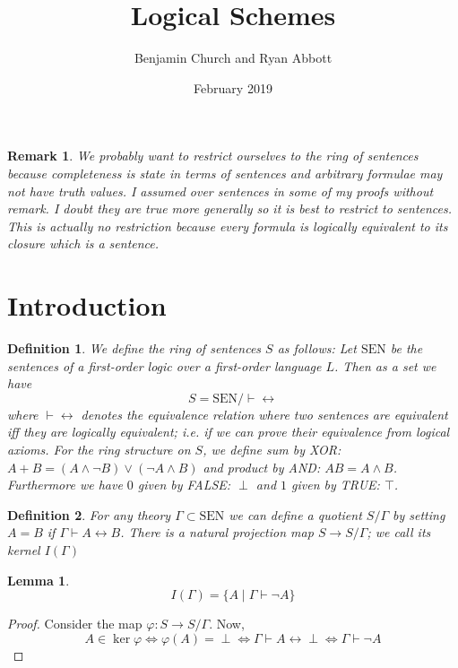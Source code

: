 \documentclass{article}
\title{Logical Schemes}
\author{Benjamin Church and Ryan Abbott}
\date{February 2019}
\newcommand{\lra}{\leftrightarrow}
\newcommand{\proves}{\vdash}
\newtheorem{lemma}{Lemma}
\theoremstyle{plain}
\newtheorem{defn}{Definition}
\newtheorem{rmk}{Remark}
\begin{document}
\maketitle

\begin{rmk}
We probably want to restrict ourselves to the ring of \textit{sentences} because completeness is state in terms of sentences and arbitrary formulae may not have truth values. I assumed over sentences in some of my proofs without remark. I doubt they are true more generally so it is best to restrict to sentences. This is actually no restriction because every formula is logically equivalent to its closure which is a sentence.
\end{rmk}

\section{Introduction}

\begin{defn}
We define the ring of sentences $S$ as follows: Let $\mathrm{SEN}$
be the sentences of a first-order logic over a first-order language $L$. Then as a set we have
\[ S = \mathrm{SEN}/ \vdash \lra \]
where $\vdash \lra$ denotes the equivalence relation
where two sentences are equivalent iff they are logically
equivalent; i.e. if we can prove their equivalence
from logical axioms.
For the ring structure on $S$, we define sum by XOR: $A + B = (A \wedge \neg B) \vee (\neg A \wedge B)$ and product by AND: $AB = A \wedge B$. Furthermore we have $0$ given by FALSE: $\perp$ and $1$ given by TRUE: $\top$.
\end{defn}

\begin{defn}
For any theory $\Gamma \subset \mathrm{SEN}$ we can
define a quotient $S / \Gamma$ by setting $A = B$
if $\Gamma \vdash A \lra B$. There is a natural projection map
$S \to S / \Gamma$; we call its kernel $I(\Gamma)$
\end{defn}


\begin{lemma}
\[ I(\Gamma) = \{A \mid \Gamma \vdash \lnot A \} \]
\end{lemma}

\begin{proof}
Consider the map $\varphi : S \to S / \Gamma$. Now,
\[ A \in \ker{\varphi} \iff \varphi(A) = \perp \iff \Gamma \proves A \lra \perp \iff \Gamma \proves \neg A \]
\end{proof}
\end{document}
